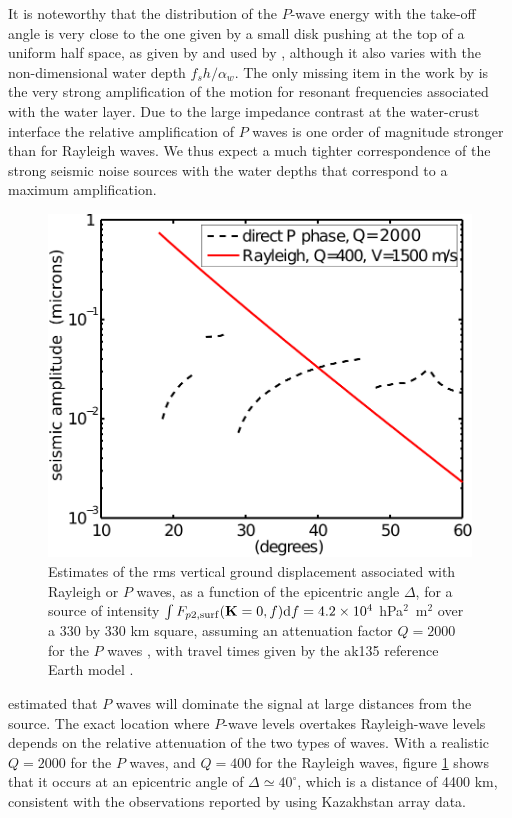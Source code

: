It is noteworthy that the distribution of the $P$-wave energy with the take-off angle is very  close to the 
one given by a small disk pushing at the top of a uniform half space, as given by \cite{Miller&Pursey1955} and used by 
\cite{Vinnik1973}, although it also varies with the non-dimensional water depth $f_s h/\alpha_w$. 
The only missing item in the work by \cite{Vinnik1973} is the very strong amplification of the motion 
for resonant frequencies associated with the water layer. Due to the large impedance contrast at the water-crust interface 
the relative amplification of $P$ waves is one order of magnitude stronger 
than for Rayleigh waves. We thus expect a much tighter correspondence of the strong seismic noise sources with 
the water depths that correspond to a maximum amplification. 


\begin{figure}
\centerline{\includegraphics[width=0.7\linewidth]{FIGS_CH_SISMO/P_waves_vs_Rayleigh.pdf}}
  \caption{Estimates of the rms vertical ground displacement associated with Rayleigh or $P$ waves, 
as a function of the epicentric angle $\Delta$, for a source of intensity 
$\int F_{p2,\mathrm{surf}}(\mathbf{K} = 0,f) \mathrm{d}f = 4.2\times 10^4$ 
hPa$^2$~m$^2$ over a 330 by 330 km square, 
assuming an attenuation factor $Q=2000$ for the $P$ waves \citep{Pasyanos&al.2009}, with travel times 
given by the ak135 reference Earth model \citep{Snoke2009}. }
\label{fig:P_vs_Rayleigh}
\end{figure}
\cite{Ardhuin&Herbers2013} estimated that $P$ waves will dominate the signal at large distances from the source. 
The exact location where $P$-wave levels overtakes Rayleigh-wave levels depends 
on the relative attenuation of the two types of waves. With a realistic $Q=2000$ for the $P$ waves, and 
$Q=400$ for the Rayleigh waves, figure \ref{fig:P_vs_Rayleigh} shows that it occurs at an epicentric angle of $\Delta \simeq 40^{\circ}$, which is a distance of 4400 km, 
consistent with the observations reported by \cite{Vinnik1973} using Kazakhstan array data.  

